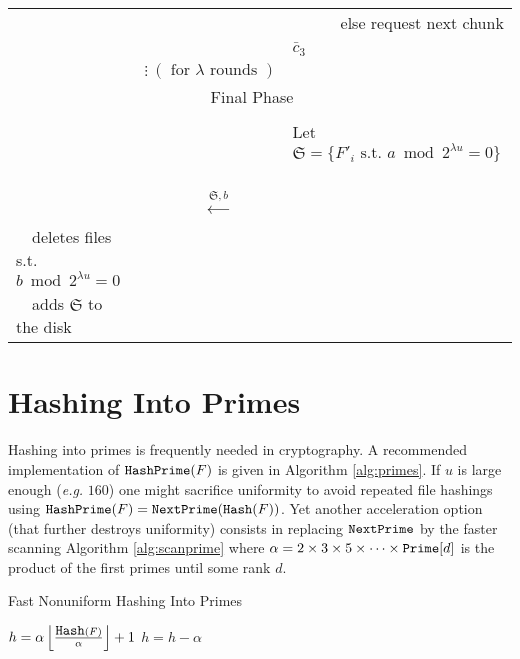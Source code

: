 \documentclass[11pt]{llncs}
\begin{document}
\begin{center}
\begin{tabular}{|lcl|}
                                   &                                                      &~~~~~~else request next chunk $\bar{c}_3$~~\\
                                   &                  $\vdots~(\mbox{~for~}\lambda \mbox{~rounds~})$    & \\\hline\hline
\multicolumn{3}{|c|}{{\sf Final Phase~~}} \\\hline
                                   &                                                      & \\
                                   &                                                      &Let $\mathfrak{S}=\{F'_i \mbox{~s.t.~} a \bmod 2^{\lambda u} =0\}$~~\\
                                   &~~{\LARGE $\stackrel{\mathfrak{S},b}{\longleftarrow}$}&\\
                                   ~~deletes files s.t. $b \bmod 2^{\lambda u} =0$&        &\\
                                   ~~adds $\mathfrak{S}$ to the disk    &                                                      &\\\hline
\end{tabular}
\end{center}

\section{Hashing Into Primes}
\label{sec:hashprime}
Hashing into primes is frequently needed in cryptography. A recommended implementation of $\mbox{{\tt HashPrime}}(F)$ is given in Algorithm \ref{alg:primes}. If $u$ is large enough ({\sl e.g.} $160$) one might sacrifice uniformity to avoid repeated file hashings using $\mbox{{\tt HashPrime}}(F)=\mbox{{\tt NextPrime}}(\mbox{{\tt Hash}}(F))$. Yet another acceleration option (that further destroys uniformity) consists in replacing $\mbox{{\tt NextPrime}}$ by the faster scanning Algorithm \ref{alg:scanprime} where $\alpha=2\times 3\times 5\times \cdots \times \mbox{{\tt Prime}}[d]$ is the product of the first primes until some rank $d$.

\begin{algorithm}
  \caption{Fast Nonuniform Hashing Into Primes}
  \label{alg:scanprime}
  \begin{algorithmic}[1]
  \State $h =\alpha \left\lfloor\frac{\mbox{{\tt Hash}}(F)}{\alpha}\right\rfloor+1$
\State $h = h-\alpha$
\EndWhile
\State {}
  \end{algorithmic}
\end{algorithm}
\end{document}
